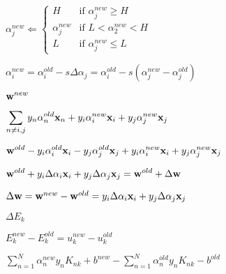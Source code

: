 \documentclass{article}
\def\lthtmlcheckvsize{\ifdim\ht\sizebox<\vsize 
  \ifdim\wd\sizebox<\hsize\expandafter\hfill\fi \expandafter\vfill
  \else\expandafter\vss\fi}%
\begin{document}
{\newpage\clearpage
{}%
$\displaystyle \alpha_j^{new}\Longleftarrow \left\{\begin{array}{cl}
H & \mbox{if }\alpha_j^{new}\ge H\\
\alpha_j^{new} & \mbox{if } L<\alpha_2^{new} < H\\
L & \mbox{if } \alpha_j^{new}\le L\end{array}\right.$%
\lthtmlindisplaymathZ
\lthtmlcheckvsize\clearpage}

{\newpage\clearpage
{}%
$\displaystyle \alpha_i^{new}=\alpha_i^{old}-s\Delta\alpha_j
=\alpha_i^{old}-s(\alpha_j^{new}-\alpha_j^{old})$%
\lthtmlindisplaymathZ
\lthtmlcheckvsize\clearpage}

{\newpage\clearpage
{}%
$\displaystyle {\bf w}^{new}$%
\lthtmlindisplaymathZ
\lthtmlcheckvsize\clearpage}

{\newpage\clearpage
{}%
$\displaystyle \sum_{n\ne i,j} y_n\alpha_n^{old}{\bf x}_n
+y_i\alpha_i^{new}{\bf x}_i+y_j\alpha_j^{new}{\bf x}_j$%
\lthtmlindisplaymathZ
\lthtmlcheckvsize\clearpage}

{\newpage\clearpage
{}%
$\displaystyle {\bf w}^{old}-y_i\alpha_i^{old}{\bf x}_i-y_j\alpha_j^{old}{\bf x}_j
+y_i\alpha_i^{new}{\bf x}_i+y_j\alpha_j^{new}{\bf x}_j$%
\lthtmlindisplaymathZ
\lthtmlcheckvsize\clearpage}

{\newpage\clearpage
{}%
$\displaystyle {\bf w}^{old}+y_i\Delta\alpha_i{\bf x}_i+y_j\Delta\alpha_j{\bf x}_j
={\bf w}^{old}+\Delta{\bf w}$%
\lthtmlindisplaymathZ
\lthtmlcheckvsize\clearpage}

{\newpage\clearpage
{}%
$ \Delta{\bf w}={\bf w}^{new}-{\bf w}^{old}
=y_i\Delta\alpha_i{\bf x}_i+y_j\Delta\alpha_j{\bf x}_j$%
\lthtmlindisplaymathZ
\lthtmlcheckvsize\clearpage}

{\newpage\clearpage
{}%
$\displaystyle \Delta E_k$%
\lthtmlindisplaymathZ
\lthtmlcheckvsize\clearpage}

{\newpage\clearpage
{}%
$\displaystyle E_k^{new}-E_k^{old}=u_k^{new}-u_k^{old}$%
\lthtmlindisplaymathZ
\lthtmlcheckvsize\clearpage}

{\newpage\clearpage
{}%
$\displaystyle \sum_{n=1}^N\alpha_n^{new}y_nK_{nk}+b^{new}
-\sum_{n=1}^N\alpha_n^{old}y_nK_{nk}-b^{old}$%
\lthtmlindisplaymathZ
\lthtmlcheckvsize\clearpage}
\end{document}
